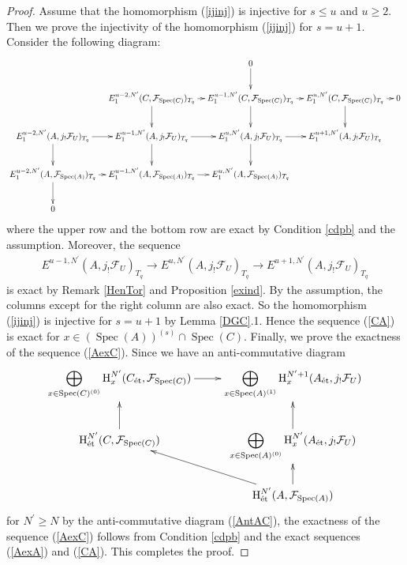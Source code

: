 \documentclass{article}
\newcommand{\spec}{\operatorname{Spec}}
\newcommand{\et}{\mathrm{\acute{e}t}}
\newcommand{\HO}{\operatorname{H}}
\begin{document}
\begin{proof}
Assume that the homomorphism (\ref{ijinj}) is injective for $s\leq u$ and $u\geq 2$.
Then we prove the injectivity of the homomorphism (\ref{ijinj}) for $s=u+1$. Consider
the following diagram:
%
\fontsize{7.7pt}{7.7pt}\selectfont
\begin{equation*}
\xymatrix@C=8pt{
&
& 0
\ar[d]
&
& 
\\
&
E^{u-2, N^{\prime}}_{1}(
C,
\mathcal{F}_{\spec(C)}
)_{T_{q}}
\ar[r]
\ar[d]
&
E^{u-1, N^{\prime}}_{1}(
C,
\mathcal{F}_{\spec(C)}
)_{T_{q}}
\ar[r]
\ar[d]
&
E_{1}^{u, N^{\prime}}(
C,
\mathcal{F}_{\spec(C)}
)_{T_{q}}
\ar[r]
\ar[d]
& 0 \\
E_{1}^{u-2, N^{\prime}}(
A,
j_{!}\mathcal{F}_{U}
)_{T_{q}}
\ar[r]
\ar[d]
&
E_{1}^{u-1, N^{\prime}}(
A,
j_{!}\mathcal{F}_{U}
)_{T_{q}}
\ar[r]
\ar[d]
&
E_{1}^{u, N^{\prime}}(
A,
j_{!}\mathcal{F}_{U}
)_{T_{q}}
\ar[r]
\ar[d]
& 
E_{1}^{u+1, N^{\prime}}(
A,
j_{!}\mathcal{F}_{U}
)_{T_{q}}
\\
E_{1}^{u-2, N^{\prime}}(
A,
\mathcal{F}_{\spec(A)}
)_{T_{q}}
\ar[r]
\ar[d]
&
E_{1}^{u-1, N^{\prime}}(
A,
\mathcal{F}_{\spec(A)}
)_{T_{q}}
\ar[r]
&
E_{1}^{u, N^{\prime}}(
A,
\mathcal{F}_{\spec(A)}
)_{T_{q}}
&
\\
0
}    
\end{equation*}
\normalsize
where 
the upper row and
the bottom row are exact by
Condition \ref{cdpb} and the assumption.
Moreover, the sequence
%
\begin{align*}
E^{u-1, N^{\prime}}(
A,
j_{!}\mathcal{F}_{U}
)_{T_{q}}    
\to
E^{u, N^{\prime}}(
A,
j_{!}\mathcal{F}_{U}
)_{T_{q}}    
\to
E^{u+1, N^{\prime}}(
A,
j_{!}\mathcal{F}_{U}
)_{T_{q}}    
\end{align*}
%
is exact by Remark \ref{HenTor} and Proposition \ref{exind}. 
By the assumption, the columns except for the right column are also exact.
So the homomorphism (\ref{ijinj}) is injective for $s=u+1$ by Lemma \ref{DGC}.1.
%
Hence the sequence (\ref{CA}) is exact for $x\in (\spec(A))^{(s)}\cap \spec(C)$.
Finally, we prove the exactness of the sequence (\ref{AexC}).
Since we have an anti-commutative diagram
%
\begin{equation*}
\xymatrix{
\displaystyle\bigoplus_{x\in\spec(C)^{(0)}}\HO_{x}^{N^{\prime}}(C_{\et}, \mathcal{F}_{\spec(C)})
\ar[r]
&
\displaystyle\bigoplus_{x\in\spec(A)^{(1)}}\HO_{x}^{N^{\prime}+1}
(A_{\et}, j_{!}\mathcal{F}_{U})
\\
\HO_{\et}^{N^{\prime}}(C, \mathcal{F}_{\spec(C)})
\ar[u]
&
\displaystyle\bigoplus_{x\in\spec(A)^{(0)}}\HO_{x}^{N^{\prime}}
(A_{\et}, j_{!}\mathcal{F}_{U})
\ar[u]
\\
&
\HO^{N^{\prime}}_{\et}(A, \mathcal{F}_{\spec(A)})
\ar[u]\ar[lu]
}
\end{equation*}
%
for $N^{\prime}\geq N$ by the anti-commutative diagram (\ref{AntAC}),
the exactness of the sequence (\ref{AexC}) follows from Condition \ref{cdpb}
and the exact sequences (\ref{AexA}) and (\ref{CA}). 
This completes the proof.
\end{proof}
%
\end{document}
